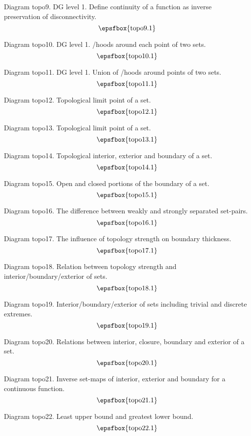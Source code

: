 Diagram topo9. DG level 1. Define continuity of a function as inverse
preservation of disconnectivity.
$$
\centerline{\epsfbox{topo9.1}}
$$

Diagram topo10. DG level 1. \Neighbour/hoods around each point of two sets.
$$
\centerline{\epsfbox{topo10.1}}
$$

Diagram topo11. DG level 1. Union of \neighbour/hoods around points of two sets.
$$
\centerline{\epsfbox{topo11.1}}
$$

\filleject

Diagram topo12. Topological limit point of a set.
$$
\centerline{\epsfbox{topo12.1}}
$$

Diagram topo13. Topological limit point of a set.
$$
\centerline{\epsfbox{topo13.1}}
$$

Diagram topo14. Topological interior, exterior and boundary of a set.
$$
\centerline{\epsfbox{topo14.1}}
$$

Diagram topo15. Open and closed portions of the boundary of a set.
$$
\centerline{\epsfbox{topo15.1}}
$$

\filleject

Diagram topo16. The difference between weakly and strongly separated set-pairs.
$$
\centerline{\epsfbox{topo16.1}}
$$

Diagram topo17. The influence of topology strength on boundary thickness.
$$
\centerline{\epsfbox{topo17.1}}
$$

Diagram topo18. Relation between topology strength and
interior/boundary/exterior of sets.
$$
\centerline{\epsfbox{topo18.1}}
$$

\filleject

Diagram topo19. Interior/boundary/exterior of sets including trivial and
discrete extremes.
$$
\centerline{\epsfbox{topo19.1}}
$$

Diagram topo20. Relations between interior, closure, boundary and exterior of a
set.
$$
\centerline{\epsfbox{topo20.1}}
$$

Diagram topo21. Inverse set-maps of interior, exterior and boundary for a
continuous function.
$$
\centerline{\epsfbox{topo21.1}}
$$

Diagram topo22. Least upper bound and greatest lower bound.
$$
\centerline{\epsfbox{topo22.1}}
$$

\filleject

